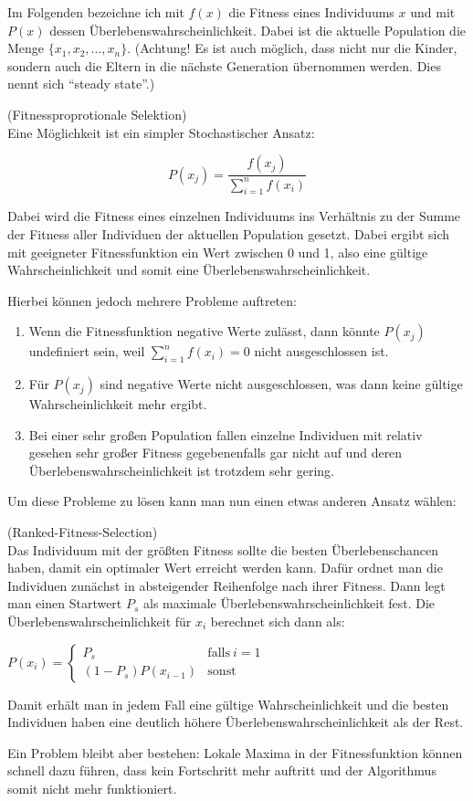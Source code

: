 Im Folgenden bezeichne ich mit $f(x)$ die Fitness eines Individuums $x$ und mit $P(x)$ dessen Überlebenswahrscheinlichkeit. Dabei ist die aktuelle Population die Menge $\{x_1,x_2,\dots,x_n\}$. (Achtung! Es ist auch möglich, dass nicht nur die Kinder, sondern auch die Eltern in die nächste Generation übernommen werden. Dies nennt sich "`steady state"'.)
\setcounter{algo}{0}
\begin{algo}(Fitnessproprotionale Selektion)\\
	Eine Möglichkeit ist ein simpler Stochastischer Ansatz:
	
	$$P(x_j)=\frac{f(x_j)}{\sum_{i=1}^{n}f(x_i)}$$
	
	Dabei wird die Fitness eines einzelnen Individuums ins Verhältnis zu der Summe der Fitness aller Individuen der aktuellen Population gesetzt. Dabei ergibt sich mit geeigneter Fitnessfunktion ein Wert zwischen 0 und 1, also eine gültige Wahrscheinlichkeit und somit eine Überlebenswahrscheinlichkeit.
	
	Hierbei können jedoch mehrere Probleme auftreten:
	
	\begin{enumerate}
		\item Wenn die Fitnessfunktion negative Werte zulässt, dann könnte $P(x_j)$ undefiniert sein, weil $\sum_{i=1}^{n}f(x_i)=0$ nicht ausgeschlossen ist.
		\item Für $P(x_j)$ sind negative Werte nicht ausgeschlossen, was dann keine gültige Wahrscheinlichkeit mehr ergibt.
		\item Bei einer sehr großen Population fallen einzelne Individuen mit relativ gesehen sehr großer Fitness gegebenenfalls gar nicht auf und deren Überlebenswahrscheinlichkeit ist trotzdem sehr gering.
	\end{enumerate}
\end{algo}
Um diese Probleme zu lösen kann man nun einen etwas anderen Ansatz wählen:
\begin{algo}(Ranked-Fitness-Selection)\\
	Das Individuum mit der größten Fitness sollte die besten Überlebenschancen haben, damit ein optimaler Wert erreicht werden kann. Dafür ordnet man die Individuen zunächst in absteigender Reihenfolge nach ihrer Fitness. Dann legt man einen Startwert $P_s$ als maximale Überlebenswahrscheinlichkeit fest. Die Überlebenswahrscheinlichkeit für $x_i$ berechnet sich dann als:
	
	\begin{center}
	$P(x_i)=\begin{cases}
	P_s & \mathrm{falls~} i=1\\
	(1-P_s)P(x_{i-1}) & \mathrm{sonst}
	\end{cases}$
	\end{center}
	
	Damit erhält man in jedem Fall eine gültige Wahrscheinlichkeit und die besten Individuen haben eine deutlich höhere Überlebenswahrscheinlichkeit als der Rest.
	
	Ein Problem bleibt aber bestehen:
	Lokale Maxima in der Fitnessfunktion können schnell dazu führen, dass kein Fortschritt mehr auftritt und der Algorithmus somit nicht mehr funktioniert.
\end{algo}
